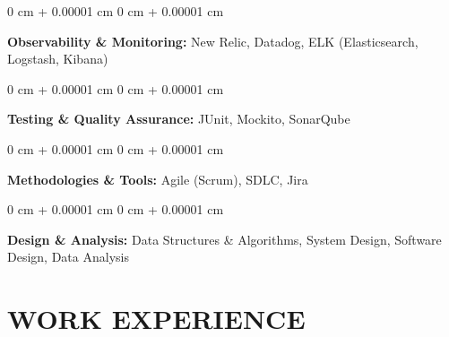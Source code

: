 \documentclass[10pt, letterpaper]{article}
\newenvironment{onecolentry}{
    \begin{adjustwidth}{
        0 cm + 0.00001 cm
    }{
        0 cm + 0.00001 cm
    }
}{
    \end{adjustwidth}
} %
\begin{document}
        \begin{onecolentry}
        \textbf{Observability \& Monitoring:}  New Relic, Datadog, ELK (Elasticsearch, Logstash, Kibana)
        \end{onecolentry}
        \vspace{0.1 cm}
        \begin{onecolentry}
        \textbf{Testing \& Quality Assurance:}  JUnit, Mockito, SonarQube
        \end{onecolentry}
        \vspace{0.1 cm}
        \begin{onecolentry}
        \textbf{Methodologies \& Tools:}  Agile (Scrum), SDLC, Jira
        \end{onecolentry}
        \vspace{0.1 cm}
        \begin{onecolentry}
        \textbf{Design \& Analysis:} Data Structures \& Algorithms, System Design, Software Design, Data Analysis
        \end{onecolentry}

        
    \vspace{0.1 cm}    
    \section{WORK EXPERIENCE}
    \vspace{0.1 cm}
        
\end{document}
